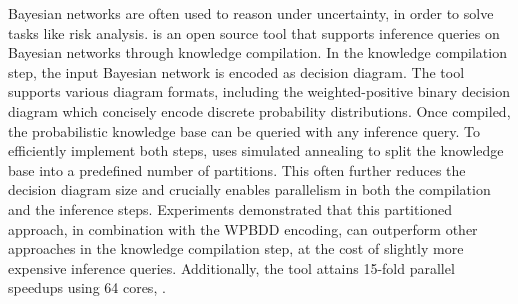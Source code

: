 
Bayesian networks are often used to reason under uncertainty,
in order to solve tasks like risk analysis. 
\toolname is an open source tool that supports inference queries on Bayesian networks through knowledge compilation.
In the knowledge compilation step, the input Bayesian network is encoded as decision diagram. The tool supports various diagram formats, including the weighted-positive binary decision diagram which concisely encode discrete probability distributions.
Once compiled, the probabilistic knowledge base can be queried with any inference query.
To efficiently implement both steps, \toolname uses simulated annealing to split the knowledge base into a predefined number of partitions. This often further reduces the decision diagram size and crucially enables parallelism in both the compilation and the inference steps.
Experiments demonstrated that this partitioned approach, in combination with the WPBDD encoding, can outperform other approaches in the knowledge compilation step, at the cost of slightly more expensive inference queries.
Additionally, the tool attains 15-fold parallel speedups using 64 cores, .






